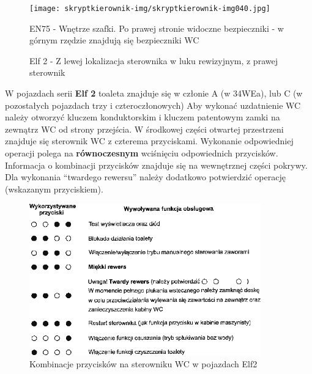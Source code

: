 \begin{figure}
		\texttt{[image: skryptkierownik-img/skryptkierownik-img040.jpg]}
		\caption{EN75 - Wnętrze szafki. Po prawej stronie widoczne bezpieczniki - w górnym rzędzie znajdują się bezpieczniki WC}
\end{figure}
\begin{figure}
	\caption{Elf 2 - Z lewej lokalizacja sterownika w luku rewizyjnym, z prawej sterownik}	
\end{figure}
W pojazdach serii \textbf{Elf 2} toaleta znajduje się w członie A (w 34WEa), lub C (w pozostałych pojazdach trzy i czteroczłonowych) Aby wykonać uzdatnienie WC należy otworzyć kluczem konduktorskim i kluczem patentowym zamki na zewnątrz WC od strony przejścia. W środkowej części otwartej przestrzeni znajduje się sterownik WC z czterema przyciskami. Wykonanie odpowiedniej operacji polega na \textbf{równoczesnym }wciśnięciu odpowiednich przycisków. Informacja o kombinacji przycisków znajduje się na wewnętrznej części pokrywy. Dla wykonania “twardego rewersu” należy dodatkowo potwierdzić operację (wskazanym przyciskiem).
\begin{figure}
	\includegraphics[width=10cm]{skryptkierownik-img/wc-elf2.png}
	\caption{Kombinacje przycisków na sterowniku WC w pojazdach Elf2}
\end{figure}
